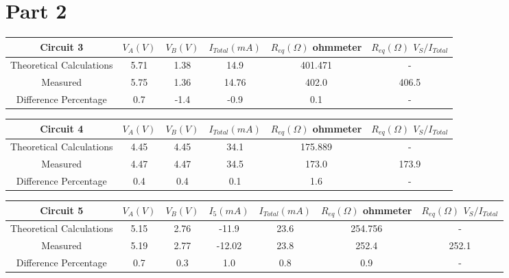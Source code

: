 \documentclass{report}
\begin{document}
    \section*{Part 2}
        \begin{center}
            \renewcommand{\arraystretch}{1.2} %
            \begin{tabular}{|c|c|c|c|c|c|}
                \hline
                \textbf{Circuit 3} & \textbf{$V_A(V)$} & \textbf{$V_B(V)$} & \textbf{$I_{Total}(mA)$} & \textbf{$R_{eq}(\Omega)$} ohmmeter & \textbf{$R_{eq}(\Omega)$} $V_S/I_{Total}$ \\
                \hline
                Theoretical Calculations & 5.71 & 1.38 & 14.9 & 401.471 & - \\
                Measured & 5.75 & 1.36 & 14.76 & 402.0 & 406.5 \\
                Difference Percentage & 0.7 & -1.4 & -0.9 & 0.1 & - \\
                \hline
            \end{tabular}
        \end{center}
        \begin{center}
            \renewcommand{\arraystretch}{1.2} %
            \begin{tabular}{|c|c|c|c|c|c|}
                \hline
                \textbf{Circuit 4} & \textbf{$V_A(V)$} & \textbf{$V_B(V)$} & \textbf{$I_{Total}(mA)$} & \textbf{$R_{eq}(\Omega)$} ohmmeter & \textbf{$R_{eq}(\Omega)$} $V_S/I_{Total}$ \\
                \hline
                Theoretical Calculations & 4.45 & 4.45 & 34.1 & 175.889 & - \\
                Measured & 4.47 & 4.47 & 34.5 & 173.0 & 173.9 \\
                Difference Percentage & 0.4 & 0.4 & 0.1 & 1.6 & - \\
                \hline
            \end{tabular}
        \end{center}
        \begin{center}
            \renewcommand{\arraystretch}{1.2} %
            \begin{tabular}{|c|c|c|c|c|c|c|}
                \hline
                \textbf{Circuit 5} & \textbf{$V_A(V)$} & \textbf{$V_B(V)$} & \textbf{$I_5(mA)$} & \textbf{$I_{Total}(mA)$} & \textbf{$R_{eq}(\Omega)$} ohmmeter & \textbf{$R_{eq}(\Omega)$} $V_S/I_{Total}$ \\
                \hline
                Theoretical Calculations & 5.15 & 2.76 & -11.9 & 23.6 & 254.756 & - \\
                Measured & 5.19 & 2.77 & -12.02 & 23.8 & 252.4 & 252.1 \\
                Difference Percentage & 0.7 & 0.3 & 1.0 & 0.8 & 0.9 & - \\
                \hline
            \end{tabular}
        \end{center}
\end{document}

